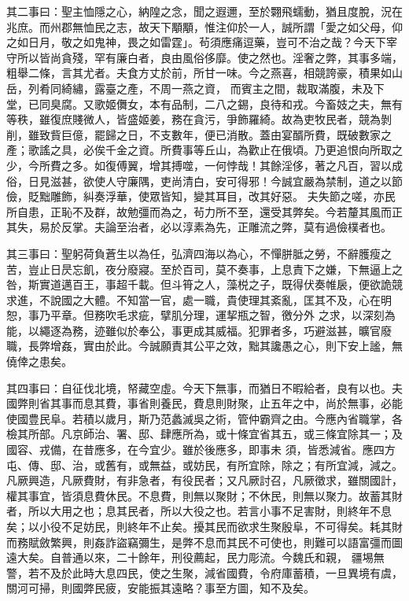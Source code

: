 \begin{pinyinscope}
 其二事曰：聖主恤隱之心，納隍之念，聞之遐邇，至於翾飛蠕動，猶且度脫，況在兆庶。而州郡無恤民之志，故天下顒顒，惟注仰於一人，誠所謂「愛之如父母，仰之如日月，敬之如鬼神，畏之如雷霆」。茍須應痛逗藥，豈可不治之哉？今天下宰守所以皆尚貪殘，罕有廉白者，良由風俗侈靡。使之然也。淫奢之弊，其事多端，粗舉二條，言其尤者。夫食方丈於前，所甘一味。今之燕喜，相競誇豪，積果如山岳，列肴同綺繡，露臺之產，不周一燕之資，
 而賓主之間，裁取滿腹，未及下堂，已同臭腐。又歌姬儛女，本有品制，二八之錫，良待和戎。今畜妓之夫，無有等秩，雖復庶賤微人，皆盛姬姜，務在貪污，爭飾羅綺。故為吏牧民者，競為剝削，雖致貲巨億，罷歸之日，不支數年，便已消散。蓋由宴醑所費，既破數家之產；歌謠之具，必俟千金之資。所費事等丘山，為歡止在俄頃。乃更追恨向所取之少，今所費之多。如復傅翼，增其搏噬，一何悖哉！其餘淫侈，著之凡百，習以成俗，日見滋甚，欲使人守廉隅，吏尚清白，安可得邪！今誠宜嚴為禁制，道之以節儉，貶黜雕飾，糾奏浮華，使眾皆知，變其耳目，改其好惡。
 夫失節之嗟，亦民所自患，正恥不及群，故勉彊而為之，茍力所不至，還受其弊矣。今若釐其風而正其失，易於反掌。夫論至治者，必以淳素為先，正雕流之弊，莫有過儉樸者也。



 其三事曰：聖躬荷負蒼生以為任，弘濟四海以為心，不憚胼胝之勞，不辭臒瘦之苦，豈止日昃忘飢，夜分廢寢。至於百司，莫不奏事，上息責下之嫌，下無逼上之咎，斯實道邁百王，事超千載。但斗筲之人，藻棁之子，既得伏奏帷扆，便欲詭競求進，不說國之大體。不知當一官，處一職，貴使理其紊亂，匡其不及，心在明恕，事乃平章。但務吹毛求疵，擘肌分理，運挈瓶之智，徼分外
 之求，以深刻為能，以繩逐為務，迹雖似於奉公，事更成其威福。犯罪者多，巧避滋甚，曠官廢職，長弊增姦，實由於此。今誠願責其公平之效，黜其讒愚之心，則下安上謐，無僥倖之患矣。



 其四事曰：自征伐北境，帑藏空虛。今天下無事，而猶日不暇給者，良有以也。夫國弊則省其事而息其費，事省則養民，費息則財聚，止五年之中，尚於無事，必能使國豊民阜。若積以歲月，斯乃范蠡滅吳之術，管仲霸齊之由。今應內省職掌，各檢其所部。凡京師治、署、邸、肆應所為，或十條宜省其五，或三條宜除其一；及國容、戎備，在昔應多，在今宜少。雖於後應多，即事未
 須，皆悉減省。應四方屯、傳、邸、治，或舊有，或無益，或妨民，有所宜除，除之；有所宜減，減之。凡厥興造，凡厥費財，有非急者，有役民者；又凡厥討召，凡厥徵求，雖關國計，權其事宜，皆須息費休民。不息費，則無以聚財；不休民，則無以聚力。故蓄其財者，所以大用之也；息其民者，所以大役之也。若言小事不足害財，則終年不息矣；以小役不足妨民，則終年不止矣。擾其民而欲求生聚殷阜，不可得矣。耗其財而務賦斂繁興，則姦詐盜竊彌生，是弊不息而其民不可使也，則難可以語富彊而圖遠大矣。自普通以來，二十餘年，刑役薦起，民力彫流。今魏氏和親，
 疆埸無警，若不及於此時大息四民，使之生聚，減省國費，令府庫蓄積，一旦異境有虞，關河可掃，則國弊民疲，安能振其遠略？事至方圖，知不及矣。




\end{pinyinscope}
